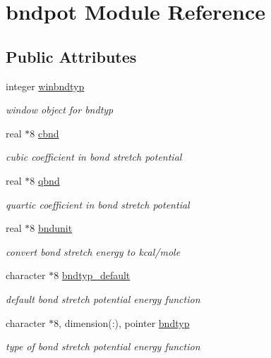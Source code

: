 \hypertarget{classbndpot}{\section{bndpot Module Reference}
\label{classbndpot}
}
\subsection*{Public Attributes}
\begin{DoxyCompactItemize}
\item 
integer \hyperlink{classbndpot_a657e334a35d5639333efbf4e1dc5e580}{winbndtyp}
\begin{DoxyCompactList}\small\item\em window object for bndtyp \end{DoxyCompactList}\item 
real $\ast$8 \hyperlink{classbndpot_af054ed3046fa7c103ad7183539e5fc5a}{cbnd}
\begin{DoxyCompactList}\small\item\em cubic coefficient in bond stretch potential \end{DoxyCompactList}\item 
real $\ast$8 \hyperlink{classbndpot_aca00517c3b6a2703d6b02b147b0a5459}{qbnd}
\begin{DoxyCompactList}\small\item\em quartic coefficient in bond stretch potential \end{DoxyCompactList}\item 
real $\ast$8 \hyperlink{classbndpot_a4cffe9af16847e8aec14989ac344d0e7}{bndunit}
\begin{DoxyCompactList}\small\item\em convert bond stretch energy to kcal/mole \end{DoxyCompactList}\item 
character $\ast$8 \hyperlink{classbndpot_abb6bababce405b897c195116b5b8aa5a}{bndtyp\-\_\-default}
\begin{DoxyCompactList}\small\item\em default bond stretch potential energy function \end{DoxyCompactList}\item 
character $\ast$8, dimension(\-:), pointer \hyperlink{classbndpot_a35a22f0f0d4da54daec518fa1f57f2be}{bndtyp}
\begin{DoxyCompactList}\small\item\em type of bond stretch potential energy function \end{DoxyCompactList}\end{DoxyCompactItemize}


